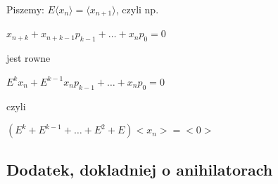 \documentclass{article}
\begin{document}
Piszemy: $E\langle x_{n}\rangle = \langle x_{n+1}\rangle$, czyli np.

$x_{n+k} + x_{n+k-1}p_{k-1} + \dots + x_{n}p_{0} = 0$

jest rowne

$E^{k}x_{n} + E^{k-1}x_{n}p_{k-1} + \dots + x_{n}p_{0} = 0$

czyli

$(E^{k} + E^{k-1} + \dots + E^{2} + E)<x_{n}> = <0>$

\subsection*{Dodatek, dokladniej o anihilatorach}
\end{document}
